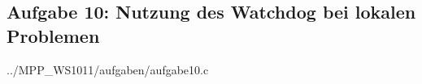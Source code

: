 \subsection*{Aufgabe 10: Nutzung des Watchdog bei lokalen Problemen}


{../MPP_WS1011/aufgaben/aufgabe10.c}
